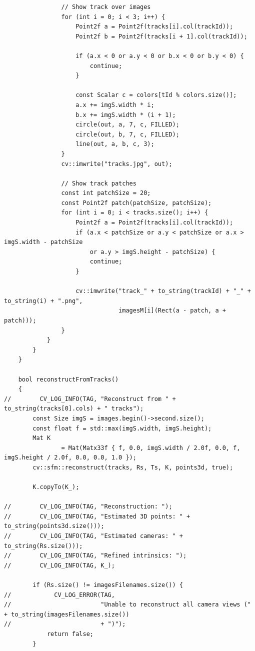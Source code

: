 \documentclass[a4paper, 12pt]{article}
\begin{document}
\begin{lstlisting}
                // Show track over images
                for (int i = 0; i < 3; i++) {
                    Point2f a = Point2f(tracks[i].col(trackId));
                    Point2f b = Point2f(tracks[i + 1].col(trackId));

                    if (a.x < 0 or a.y < 0 or b.x < 0 or b.y < 0) {
                        continue;
                    }

                    const Scalar c = colors[tId % colors.size()];
                    a.x += imgS.width * i;
                    b.x += imgS.width * (i + 1);
                    circle(out, a, 7, c, FILLED);
                    circle(out, b, 7, c, FILLED);
                    line(out, a, b, c, 3);
                }
                cv::imwrite("tracks.jpg", out);

                // Show track patches
                const int patchSize = 20;
                const Point2f patch(patchSize, patchSize);
                for (int i = 0; i < tracks.size(); i++) {
                    Point2f a = Point2f(tracks[i].col(trackId));
                    if (a.x < patchSize or a.y < patchSize or a.x > imgS.width - patchSize
                        or a.y > imgS.height - patchSize) {
                        continue;
                    }

                    cv::imwrite("track_" + to_string(trackId) + "_" + to_string(i) + ".png",
                                imagesM[i](Rect(a - patch, a + patch)));
                }
            }
        }
    }

    bool reconstructFromTracks()
    {
//        CV_LOG_INFO(TAG, "Reconstruct from " + to_string(tracks[0].cols) + " tracks");
        const Size imgS = images.begin()->second.size();
        const float f = std::max(imgS.width, imgS.height);
        Mat K
                = Mat(Matx33f { f, 0.0, imgS.width / 2.0f, 0.0, f, imgS.height / 2.0f, 0.0, 0.0, 1.0 });
        cv::sfm::reconstruct(tracks, Rs, Ts, K, points3d, true);

        K.copyTo(K_);

//        CV_LOG_INFO(TAG, "Reconstruction: ");
//        CV_LOG_INFO(TAG, "Estimated 3D points: " + to_string(points3d.size()));
//        CV_LOG_INFO(TAG, "Estimated cameras: " + to_string(Rs.size()));
//        CV_LOG_INFO(TAG, "Refined intrinsics: ");
//        CV_LOG_INFO(TAG, K_);

        if (Rs.size() != imagesFilenames.size()) {
//            CV_LOG_ERROR(TAG,
//                         "Unable to reconstruct all camera views (" + to_string(imagesFilenames.size())
//                         + ")");
            return false;
        }


\end{lstlisting}
\end{document}
